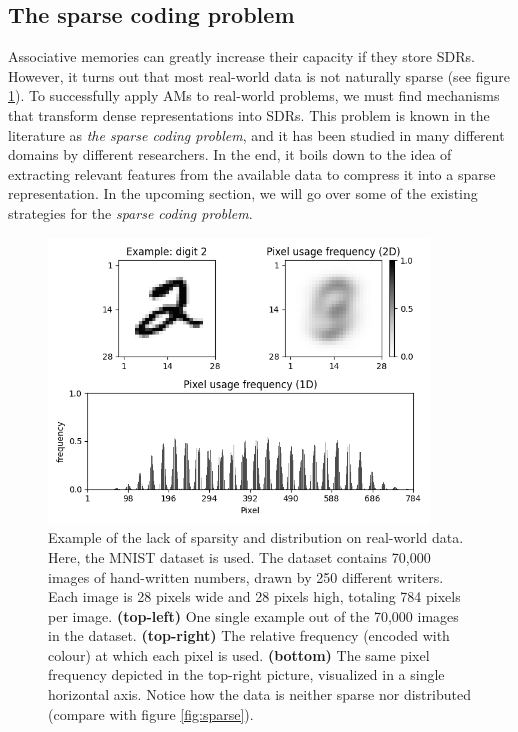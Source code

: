 \documentclass{article}
\begin{document}
\subsection{The sparse coding problem}
Associative memories can greatly increase their capacity if they store SDRs. However, it turns out that most real-world data is not naturally sparse (see figure \ref{fig:mnist}). To successfully apply AMs to real-world problems, we must find mechanisms that transform dense representations into SDRs. This problem is known in the literature as \textit{the sparse coding problem}, and it has been studied in many different domains by different researchers. In the end, it boils down to the idea of extracting relevant features from the available data to compress it into a sparse representation. In the upcoming section, we will go over some of the existing strategies for the \textit{sparse coding problem}.

\begin{figure}[h]
    \centering
    \includegraphics[width=0.9\textwidth]{img/MNIST.png}
    \caption{ Example of the lack of sparsity and distribution on real-world data. Here, the MNIST dataset \cite{lecun1998mnist} is used. The dataset contains 70,000 images of hand-written numbers, drawn by 250 different writers. Each image is 28 pixels wide and 28 pixels high, totaling 784 pixels per image.
    \textbf{(top-left)} One single example out of the 70,000 images in the dataset. 
    \textbf{(top-right)} The relative frequency (encoded with colour) at which each pixel is used. 
    \textbf{(bottom)} The same pixel frequency depicted in the top-right picture, visualized in a single horizontal axis. Notice how the data is neither sparse nor distributed (compare with figure \ref{fig:sparse}).}
\label{fig:mnist}
\end{figure}
\end{document}
